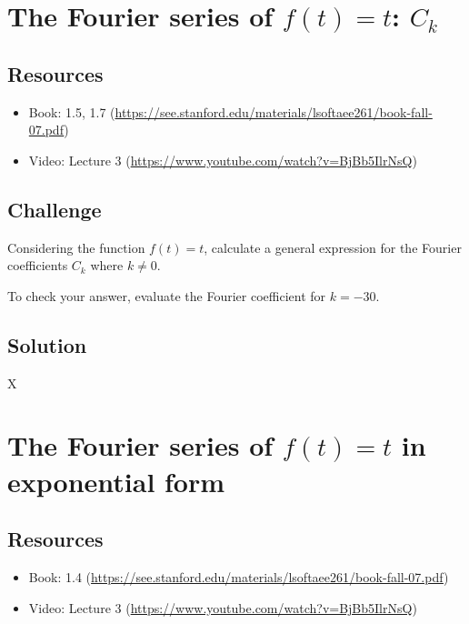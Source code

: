 \section{The Fourier series of $f(t)=t$: $C_k$}

\subsection*{Resources}
\begin{itemize}
    \item Book: 1.5, 1.7 (\url{https://see.stanford.edu/materials/lsoftaee261/book-fall-07.pdf})
    \item Video: Lecture 3 (\url{https://www.youtube.com/watch?v=BjBb5IlrNsQ})
\end{itemize}

\subsection*{Challenge}
Considering the function $f(t)=t$, calculate a general expression for the Fourier coefficients $C_k$ where $k \ne 0$.

To check your answer, evaluate the Fourier coefficient for $k=-30$.

\subsection*{Solution}
X





\newpage

\section{The Fourier series of $f(t)=t$ in exponential form}
\label{sec:fstexpform}

\subsection*{Resources}
\begin{itemize}
    \item Book: 1.4 (\url{https://see.stanford.edu/materials/lsoftaee261/book-fall-07.pdf})
    \item Video: Lecture 3 (\url{https://www.youtube.com/watch?v=BjBb5IlrNsQ})
\end{itemize}

